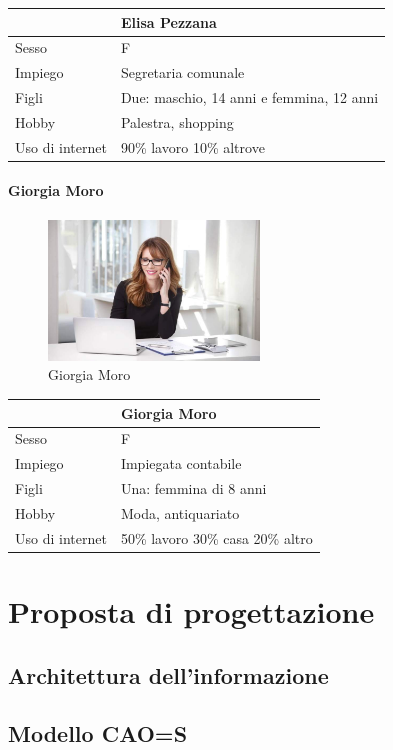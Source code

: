 \documentclass[12pt,italian,]{report}
\begin{document}
\begin{longtable}[]{@{}ll@{}}
\toprule
& Elisa Pezzana\tabularnewline
\midrule
\endhead
Sesso & F\tabularnewline
Impiego & Segretaria comunale\tabularnewline
Figli & Due: maschio, 14 anni e femmina, 12 anni\tabularnewline
Hobby & Palestra, shopping\tabularnewline
Uso di internet & 90\% lavoro 10\% altrove\tabularnewline
\bottomrule
\end{longtable}

\hypertarget{giorgia-moro}{%
\subsubsection{Giorgia Moro}\label{giorgia-moro}}

\begin{figure}[h]
\centering
\includegraphics[width=0.5\textwidth,height=\textheight]{img/giorgia.jpg}
\caption{Giorgia Moro}
\end{figure}

\begin{longtable}[]{@{}ll@{}}
\toprule
& Giorgia Moro\tabularnewline
\midrule
\endhead
Sesso & F\tabularnewline
Impiego & Impiegata contabile\tabularnewline
Figli & Una: femmina di 8 anni\tabularnewline
Hobby & Moda, antiquariato\tabularnewline
Uso di internet & 50\% lavoro 30\% casa 20\% altro\tabularnewline
\bottomrule
\end{longtable}

\hypertarget{proposta-di-progettazione}{%
\chapter{Proposta di progettazione}\label{proposta-di-progettazione}}

\hypertarget{architettura-dellinformazione}{%
\section{Architettura
dell'informazione}\label{architettura-dellinformazione}}

\hypertarget{modello-caos}{%
\section{Modello CAO=S}\label{modello-caos}}
\end{document}
